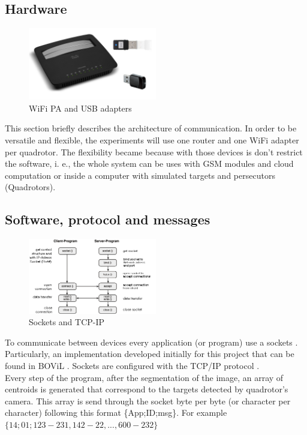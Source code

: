 \subsection{Hardware}
\begin{figure}
	\includegraphics[width=0.5\textwidth]{../Images/c2/hardware_comm.jpg}
	\caption{WiFi PA and USB adapters}
	\label{fig:hardwareComm}
\end{figure}

This section briefly describes the architecture of communication. In order to be versatile and flexible, the experiments will use one router and one WiFi adapter per quadrotor. The flexibility became because with those devices is don't restrict the software, i. e., the whole system can be uses with GSM modules and cloud computation or inside a computer with simulated targets and persecutors (Quadrotors).



\subsection{Software, protocol and messages}

\begin{figure}
	\begin{center}
		\includegraphics[width=0.5\textwidth, natwidth=448, natheight=263]{../Images/c2/socketstcpip.png}
	\end{center}
	\caption{Sockets and TCP-IP}
	\label{fig:socketstcpip}
\end{figure}

To communicate between devices every application (or program) use a sockets \cite{SocketWiki}. Particularly, an implementation developed initially for this project that can be found in BOViL \cite{BOViL}. Sockets are configured with the TCP/IP protocol \cite{TCPIP}. \\
Every step of the program, after the segmentation of the image, an array of centroids is generated that correspond to the targets detected by quadrotor's camera. This array is send through the socket byte per byte (or character per character) following this format \{App;ID;msg\}. For example $\{14;01;123-231,142-22,...,600-232\}$

